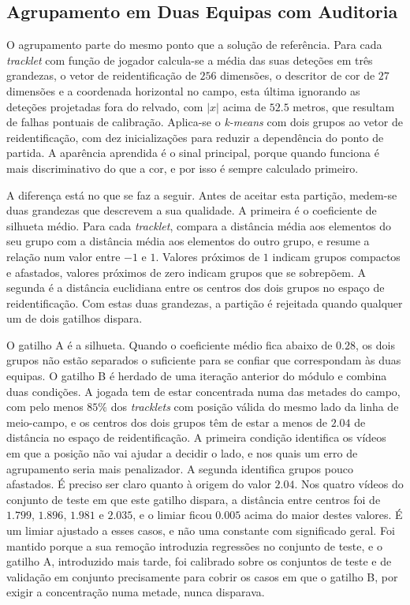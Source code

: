\subsection{Agrupamento em Duas Equipas com Auditoria}\label{sec:agrupamento}

O agrupamento parte do mesmo ponto que a solução de referência. Para cada \emph{tracklet} com função de jogador calcula-se a média das suas deteções em três grandezas, o vetor de reidentificação de $256$ dimensões, o descritor de cor de $27$ dimensões e a coordenada horizontal no campo, esta última ignorando as deteções projetadas fora do relvado, com $|x|$ acima de $52.5$ metros, que resultam de falhas pontuais de calibração. Aplica-se o \emph{k-means} com dois grupos ao vetor de reidentificação, com dez inicializações para reduzir a dependência do ponto de partida. A aparência aprendida é o sinal principal, porque quando funciona é mais discriminativo do que a cor, e por isso é sempre calculado primeiro.

A diferença está no que se faz a seguir. Antes de aceitar esta partição, medem-se duas grandezas que descrevem a sua qualidade. A primeira é o coeficiente de silhueta médio. Para cada \emph{tracklet}, compara a distância média aos elementos do seu grupo com a distância média aos elementos do outro grupo, e resume a relação num valor entre $-1$ e $1$. Valores próximos de $1$ indicam grupos compactos e afastados, valores próximos de zero indicam grupos que se sobrepõem. A segunda é a distância euclidiana entre os centros dos dois grupos no espaço de reidentificação. Com estas duas grandezas, a partição é rejeitada quando qualquer um de dois gatilhos dispara.

O gatilho A é a silhueta. Quando o coeficiente médio fica abaixo de $0.28$, os dois grupos não estão separados o suficiente para se confiar que correspondam às duas equipas. O gatilho B é herdado de uma iteração anterior do módulo e combina duas condições. A jogada tem de estar concentrada numa das metades do campo, com pelo menos $85\%$ dos \emph{tracklets} com posição válida do mesmo lado da linha de meio-campo, e os centros dos dois grupos têm de estar a menos de $2.04$ de distância no espaço de reidentificação. A primeira condição identifica os vídeos em que a posição não vai ajudar a decidir o lado, e nos quais um erro de agrupamento seria mais penalizador. A segunda identifica grupos pouco afastados. É preciso ser claro quanto à origem do valor $2.04$. Nos quatro vídeos do conjunto de teste em que este gatilho dispara, a distância entre centros foi de $1.799$, $1.896$, $1.981$ e $2.035$, e o limiar ficou $0.005$ acima do maior destes valores. É um limiar ajustado a esses casos, e não uma constante com significado geral. Foi mantido porque a sua remoção introduzia regressões no conjunto de teste, e o gatilho A, introduzido mais tarde, foi calibrado sobre os conjuntos de teste e de validação em conjunto precisamente para cobrir os casos em que o gatilho B, por exigir a concentração numa metade, nunca disparava.

